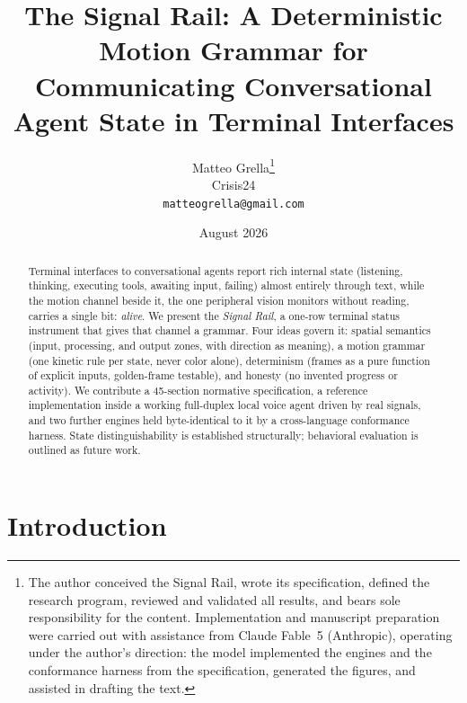 \documentclass[11pt]{article}
\title{The Signal Rail: A Deterministic Motion Grammar for\\
Communicating Conversational Agent State in Terminal Interfaces}
\author{Matteo Grella\thanks{The author conceived the Signal Rail, wrote
its specification, defined the research program, reviewed and validated
all results, and bears sole responsibility for the content.
Implementation and manuscript preparation were carried out with
assistance from Claude Fable~5 (Anthropic), operating under
the author's direction: the model implemented the engines and the
conformance harness from the specification, generated the figures, and
assisted in drafting the text.}\\
\normalsize Crisis24\\
\normalsize\texttt{matteogrella@gmail.com}}
\date{August 2026}
\begin{document}
\maketitle

\begin{abstract}
Terminal interfaces to conversational agents report rich internal state (listening, thinking, executing tools, awaiting input, failing) almost entirely through text, while the motion channel beside
it, the one peripheral vision monitors without reading, carries a single
bit: \emph{alive}. We present the \emph{Signal Rail}, a one-row terminal
status instrument that gives that channel a grammar. Four ideas govern
it: spatial semantics (input, processing, and output zones, with
direction as meaning), a motion grammar (one kinetic rule per state,
never color alone), determinism (frames as a pure function of explicit
inputs, golden-frame testable), and honesty (no invented progress or
activity). We contribute a 45-section normative specification, a
reference implementation inside a working full-duplex local voice agent
driven by real signals, and two further engines held byte-identical to
it by a cross-language conformance harness. State distinguishability is
established structurally; behavioral evaluation is outlined as future
work.
\end{abstract}

\section{Introduction}
\end{document}
